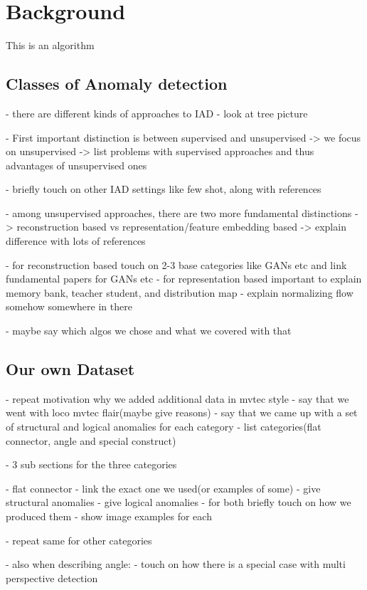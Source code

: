 \chapter{Background}
\label{chap:background}
This is an algorithm 





\section{Classes of Anomaly detection}
- there are different kinds of approaches to IAD
- look at tree picture
 
- First important distinction is between supervised and unsupervised
-> we focus on unsupervised
-> list problems with supervised approaches and thus advantages of unsupervised ones

- briefly touch on other IAD settings like few shot, along with references

- among unsupervised approaches, there are two more fundamental distinctions
-> reconstruction based vs representation/feature embedding based
-> explain difference with lots of references

- for reconstruction based touch on 2-3 base categories like GANs etc and link fundamental papers for GANs etc
- for representation based important to explain memory bank, teacher student, and distribution map
- explain normalizing flow somehow somewhere in there

- maybe say which algos we chose and what we covered with that


\section{Our own Dataset}
- repeat motivation why we added additional data in mvtec style
- say that we went with loco mvtec flair(maybe give reasons)
- say that we came up with a set of structural and logical anomalies for each category
- list categories(flat connector, angle and special construct)

- 3 sub sections for the three categories

- flat connector
- link the exact one we used(or examples of some)
- give structural anomalies
- give logical anomalies
- for both briefly touch on how we produced them
- show image examples for each

- repeat same for other categories

- also when describing angle:
- touch on how there is a special case with multi perspective detection




